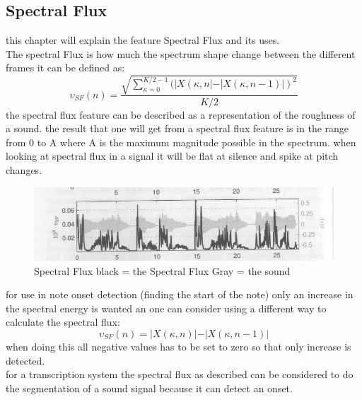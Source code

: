 \subsection{Spectral Flux}
this chapter will explain the feature Spectral Flux and its uses.\\
The spectral Flux is how much the spectrum shape change between the different frames it can be defined as\citep{ACA}:
\begin{equation}\label{Spectral Flux eq}
	\upsilon_{SF}(n) = \frac{\sqrt{\displaystyle\sum_{\kappa=0}^{K/2-1}(\vert X(\kappa,n\vert-\vert X(\kappa,n-1)\vert)^2}}{K/2}
\end{equation} 
the spectral flux feature can be described as a representation of the roughness of a sound. the result that one will get from a spectral flux feature is in the range from 0 to A where A is the maximum magnitude possible in the spectrum\citep{ACA}. when looking at spectral flux in a signal it will be flat at silence and spike at pitch changes\citep{ACA}.
\begin{figure}[h]
	\begin{center}
		\includegraphics[scale = 0.5]{fig/spectral_flux.jpg}
		\caption{Spectral Flux black = the Spectral Flux Gray = the sound}
		\label{Spectral flux pic}
	\end{center}
\end{figure}
for use in note onset detection (finding the start of the note) only an increase in the spectral energy is wanted an one can consider using a different way to calculate the spectral flux\citep{ACA}:
\begin{equation}
	\upsilon_{SF}(n) = \vert X(\kappa,n)\vert-\vert X(\kappa,n-1)\vert
\end{equation}
when doing this all negative values has to be set to zero so that only increase is detected\citep{ACA}.
\\
for a transcription system the spectral flux as described can be considered to do the segmentation of a sound signal because it can detect an onset. 
 
